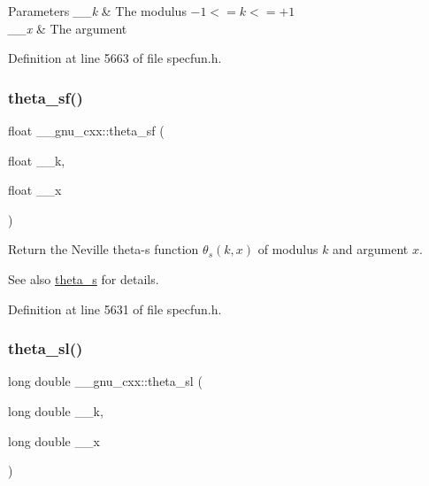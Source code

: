 \begin{DoxyParams}{Parameters}
{\em \+\_\+\+\_\+k} & The modulus $ -1 <= k <= +1 $ \\
\hline
{\em \+\_\+\+\_\+x} & The argument \\
\hline
\end{DoxyParams}


Definition at line 5663 of file specfun.\+h.

\mbox{\label{group__gnu__math__spec__func_ga5e69cf30c9a4cc057accc43e8c4bf7a3}} 
\subsubsection{\texorpdfstring{theta\+\_\+sf()}{theta\_sf()}}
{\footnotesize\ttfamily float \+\_\+\+\_\+gnu\+\_\+cxx\+::theta\+\_\+sf (\begin{DoxyParamCaption}\item[{float}]{\+\_\+\+\_\+k,  }\item[{float}]{\+\_\+\+\_\+x }\end{DoxyParamCaption})\hspace{0.3cm}{\ttfamily [inline]}}

Return the Neville theta-\/s function $ \theta_s(k,x) $ of modulus $ k $ and argument $ x $.

\begin{DoxySeeAlso}{See also}
\hyperlink{group__gnu__math__spec__func_gaf28f2dca107531890b49cccf2bdd67be}{theta\+\_\+s} for details. 
\end{DoxySeeAlso}


Definition at line 5631 of file specfun.\+h.

\mbox{\label{group__gnu__math__spec__func_gac574077067a4e7b24a0a9ff2d537d885}} 
\subsubsection{\texorpdfstring{theta\+\_\+sl()}{theta\_sl()}}
{\footnotesize\ttfamily long double \+\_\+\+\_\+gnu\+\_\+cxx\+::theta\+\_\+sl (\begin{DoxyParamCaption}\item[{long double}]{\+\_\+\+\_\+k,  }\item[{long double}]{\+\_\+\+\_\+x }\end{DoxyParamCaption})\hspace{0.3cm}{\ttfamily [inline]}}

